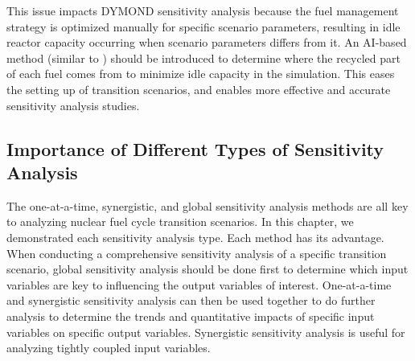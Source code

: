 This issue impacts DYMOND sensitivity analysis 
because the fuel management strategy is 
optimized manually for specific scenario parameters, resulting in 
idle reactor capacity occurring when scenario parameters differs 
from it. 
An AI-based method (similar to \deploy) 
should be introduced to 
determine where the recycled part of each fuel comes from to 
minimize idle capacity in the simulation. 
This eases the setting up of transition scenarios, and enables 
more effective and accurate sensitivity analysis studies.

\subsection{Importance of Different Types of Sensitivity Analysis}
The one-at-a-time, synergistic, and global sensitivity analysis methods 
are all key to analyzing nuclear fuel cycle transition scenarios. 
In this chapter, we demonstrated each sensitivity analysis type. 
Each method has its advantage. 
When conducting a comprehensive sensitivity analysis of a specific 
transition scenario, 
global sensitivity analysis should be done first to 
determine which input variables are key to influencing the output 
variables of interest. 
One-at-a-time and synergistic sensitivity analysis can then be used together to 
do further analysis to determine the trends and quantitative impacts 
of specific input variables on specific output variables. 
Synergistic sensitivity analysis is useful for analyzing 
tightly coupled input variables.  
